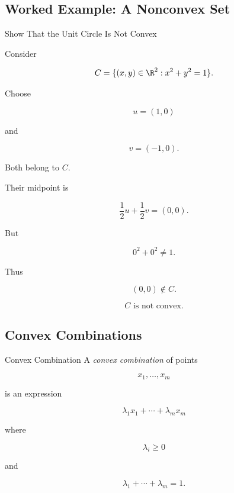 \subsection{Worked Example: A Nonconvex Set}
\label{subsec:worked-nonconvex-set}

\begin{workedexamplebox}{Show That the Unit Circle Is Not Convex}

Consider

\[
C=
\{(x,y)\in\R^2:x^2+y^2=1\}.
\]

Choose

\[
u=(1,0)
\]

and

\[
v=(-1,0).
\]

Both belong to \(C\).

Their midpoint is

\[
\frac12u+\frac12v
=
(0,0).
\]

But

\[
0^2+0^2\neq1.
\]

Thus

\[
(0,0)\notin C.
\]

\begin{answerbox}
\[
\boxed{
C\text{ is not convex.}
}
\]
\end{answerbox}
\end{workedexamplebox}

\subsection{Convex Combinations}
\label{subsec:convex-combinations}

\begin{definitionbox}{Convex Combination}
A \emph{convex combination} of points

\[
x_1,\ldots,x_m
\]

is an expression

\[
\boxed{
\lambda_1x_1+\cdots+\lambda_mx_m
}
\]

where

\[
\boxed{
\lambda_i\geq0
}
\]

and

\[
\boxed{
\lambda_1+\cdots+\lambda_m=1.
}
\]
\end{definitionbox}

